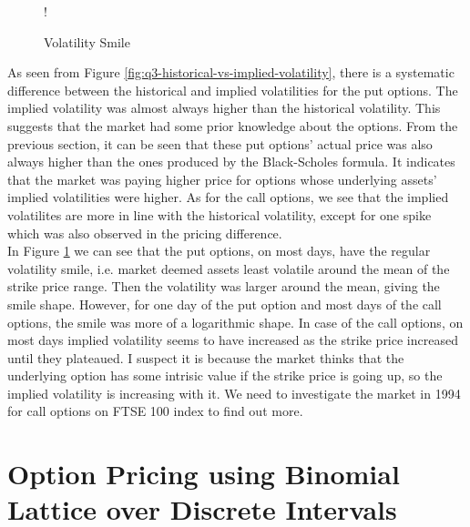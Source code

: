 \documentclass[11pt, fleqn]{article}
\begin{document}
\begin{figure}[!h]
   \centering 
   	\resizebox {0.6\textwidth} {!} { }
    \caption{Volatility Smile}
	\label{fig:q3-volatility-smile}
\end{figure}

As seen from Figure \ref{fig:q3-historical-vs-implied-volatility}, there is a systematic difference between the historical and implied volatilities for the put options. The implied volatility was almost always higher than the historical volatility. This suggests that the market had some prior knowledge about the options. From the previous section, it can be seen that these put options' actual price was also always higher than the ones produced by the Black-Scholes formula. It indicates that the market was paying higher price for options whose underlying assets' implied volatilities were higher. As for the call options, we see that the implied volatilites are more in line with the historical volatility, except for one spike which was also observed in the pricing difference.\\

In Figure \ref{fig:q3-volatility-smile} we can see that the put options, on most days, have the regular volatility smile, i.e. market deemed assets least volatile around the mean of the strike price range. Then the volatility was larger around the mean, giving the smile shape. However, for one day of the put option and most days of the call options, the smile was more of a logarithmic shape. In case of the call options, on most days implied volatility seems to have increased as the strike price increased until they plateaued. I suspect it is because the market thinks that the underlying option has some intrisic value if the strike price is going up, so the implied volatility is increasing with it. We need to investigate the market in 1994 for call options on FTSE 100 index to find out more.

\section{Option Pricing using Binomial Lattice over Discrete Intervals}
\end{document}
